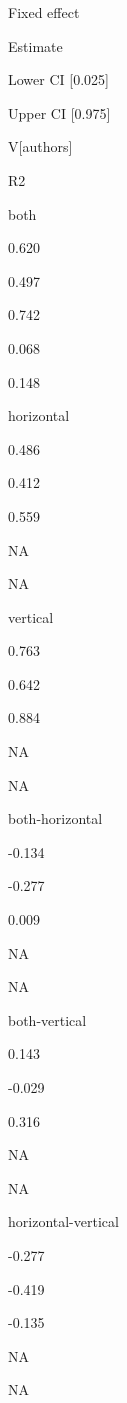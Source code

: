 \documentclass[
]{article}
\begin{document}
Fixed effect

Estimate

Lower CI {[}0.025{]}

Upper CI {[}0.975{]}

V{[}authors{]}

R2

both

0.620

0.497

0.742

0.068

0.148

horizontal

0.486

0.412

0.559

NA

NA

vertical

0.763

0.642

0.884

NA

NA

both-horizontal

-0.134

-0.277

0.009

NA

NA

both-vertical

0.143

-0.029

0.316

NA

NA

horizontal-vertical

-0.277

-0.419

-0.135

NA

NA
\end{document}
